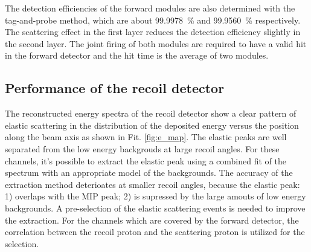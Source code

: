 \documentclass[number,5p]{elsarticle}
\begin{document}
The detection efficiencies of the forward modules are also determined with the
tag-and-probe method, which are about \SI{99.9978}{\percent} and \SI{99.9560}{\percent} respectively.
The scattering effect in the first layer reduces the detection efficiency slightly in the second layer.
The joint firing of both modules are required to have a valid hit in the
forward detector and the hit time is the average of two modules.

\subsection{Performance of the recoil detector}
\label{sec:recoil_performance}
The reconstructed energy spectra of the recoil detector show a clear pattern
of elastic scattering in the distribution of the deposited energy versus the
position along the beam axis as shown in Fit. \ref{fig:e_map}.
The elastic peaks are well separated from the low energy backgrouds at large recoil angles.
For these channels, it's possible to extract the elastic peak using a combined fit of the spectrum with an appropriate model of the backgrounds.
The accuracy of the extraction method deterioates at smaller recoil angles, because the elastic peak:
1) overlaps with the MIP peak; 2) is supressed by the large amouts of low energy backgrounds.
A pre-selection of the elastic scattering events is needed to improve the extraction.
For the channels which are covered by the forward detector, the correlation
between the recoil proton and the scattering proton is utilized for the selection.
\end{document}
